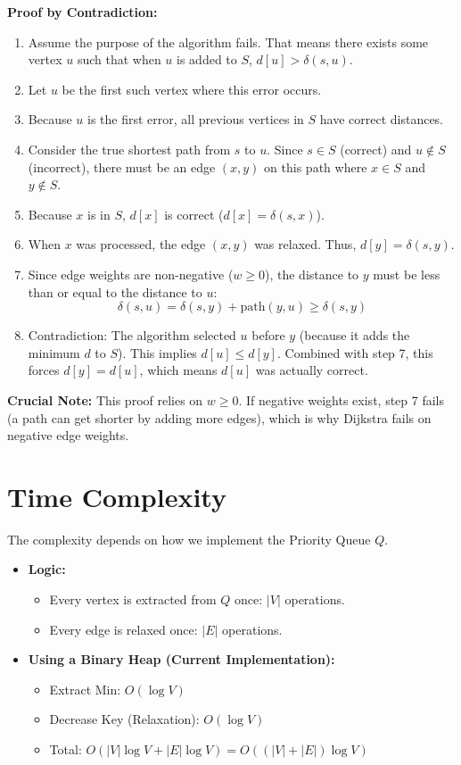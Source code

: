 \documentclass{article}
\begin{document}
\textbf{Proof by Contradiction:}
\begin{enumerate}
    \item Assume the purpose of the algorithm fails. That means there exists some vertex $u$ such that when $u$ is added to $S$, $d[u] > \delta(s, u)$.
    \item Let $u$ be the first such vertex where this error occurs.
    \item Because $u$ is the first error, all previous vertices in $S$ have correct distances.
    \item Consider the true shortest path from $s$ to $u$. Since $s \in S$ (correct) and $u \notin S$ (incorrect), there must be an edge $(x, y)$ on this path where $x \in S$ and $y \notin S$.
    \item Because $x$ is in $S$, $d[x]$ is correct ($d[x] = \delta(s, x)$).
    \item When $x$ was processed, the edge $(x, y)$ was relaxed. Thus, $d[y] = \delta(s, y)$.
    \item Since edge weights are non-negative ($w \ge 0$), the distance to $y$ must be less than or equal to the distance to $u$:
    \[ \delta(s, u) = \delta(s, y) + \text{path}(y, u) \ge \delta(s, y) \]
    \item Contradiction: The algorithm selected $u$ before $y$ (because it adds the minimum $d$ to $S$). This implies $d[u] \le d[y]$.
    Combined with step 7, this forces $d[y] = d[u]$, which means $d[u]$ was actually correct.
\end{enumerate}

\textbf{Crucial Note:} This proof relies on $w \ge 0$. If negative weights exist, step 7 fails (a path can get shorter by adding more edges), which is why Dijkstra fails on negative edge weights.

\section{Time Complexity}
The complexity depends on how we implement the Priority Queue $Q$.
\begin{itemize}
    \item \textbf{Logic:}
    \begin{itemize}
        \item Every vertex is extracted from $Q$ once: $|V|$ operations.
        \item Every edge is relaxed once: $|E|$ operations.
    \end{itemize}
    \item \textbf{Using a Binary Heap (Current Implementation):}
    \begin{itemize}
        \item Extract Min: $O(\log V)$
        \item Decrease Key (Relaxation): $O(\log V)$
        \item Total: $O(|V|\log V + |E|\log V) = O((|V| + |E|) \log V)$
    \end{itemize}
\end{itemize}
\end{document}
